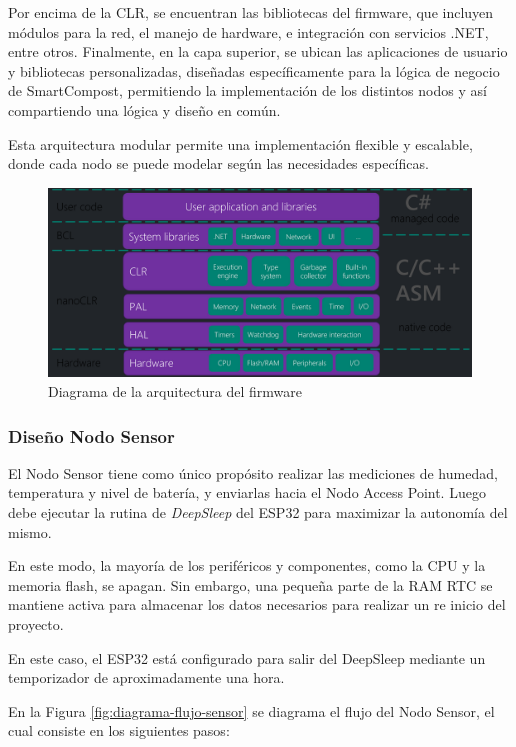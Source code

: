 Por encima de la CLR, se encuentran las bibliotecas del firmware, que incluyen módulos para la red, el manejo de hardware, e integración con servicios .NET, entre otros. Finalmente, en la capa superior, se ubican las aplicaciones de usuario y bibliotecas personalizadas, diseñadas específicamente para la lógica de negocio de SmartCompost, permitiendo la implementación de los distintos nodos y así compartiendo una lógica y diseño en común.

Esta arquitectura modular permite una implementación flexible y escalable, donde cada nodo se puede modelar según las necesidades específicas.

\begin{figure}[H]
    \centering
    \includegraphics[width=1\linewidth]{Figures/Firmware/nanoframework_arq.png}
    \caption{Diagrama de la arquitectura del firmware}
    \label{fig:enter-label}
\end{figure}

\subsubsection{Diseño Nodo Sensor}


El Nodo Sensor tiene como único propósito realizar las mediciones de humedad, temperatura y nivel de batería, y enviarlas hacia el Nodo Access Point. Luego debe ejecutar la rutina de \textit{DeepSleep} del ESP32 para maximizar la autonomía del mismo.

En este modo, la mayoría de los periféricos y componentes, como la CPU y la memoria flash, se apagan. Sin embargo, una pequeña parte de la RAM RTC se mantiene activa para almacenar los datos necesarios para realizar un re inicio del proyecto.

En este caso, el ESP32 está configurado para salir del DeepSleep mediante un temporizador de aproximadamente una hora. 

En la Figura \ref{fig:diagrama-flujo-sensor} se diagrama el flujo del Nodo Sensor, el cual consiste en los siguientes pasos:

